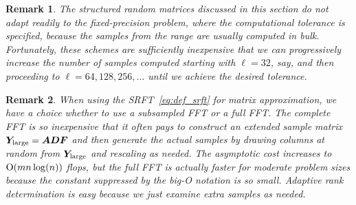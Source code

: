 \documentclass{article}
\newtheorem{remark}{Remark}
\begin{document}
\lsp

\begin{remark}\rm
\label{remark:SRFT_fixedaccuracy}
The structured random matrices discussed in this section
do not adapt readily to the fixed-precision problem, where
the computational tolerance is specified, because the
samples from the range are usually computed in bulk.
Fortunately, these schemes are sufficiently inexpensive that
we can progressively increase the number of samples
computed starting with $\ell = 32$, say, and then
proceeding to $\ell = 64, 128, 256, \dots$ until we achieve
the desired tolerance.
\end{remark}

\lsp

\begin{remark}\rm
When using the SRFT~\eqref{eq:def_srft} for matrix approximation,
we have a choice whether to use a subsampled FFT or a full FFT.
The complete FFT is so inexpensive that it often pays to construct
an extended sample matrix $\bm{Y}_{\rm large} = \bm{ADF}$
and then generate the actual samples by drawing columns at random
from $\bm{Y}_{\rm large}$ and rescaling as needed.
The asymptotic cost increases to $\mathrm{O}(mn\log(n))$
flops, but the full FFT is actually faster for moderate problem
sizes because the constant suppressed by the big-O notation is so
small.  Adaptive rank determination is easy because we just examine
extra samples as needed.
\end{remark}
%


\end{document}
